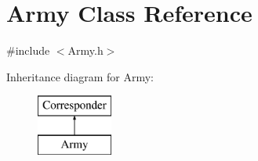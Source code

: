 \hypertarget{class_army}{}\section{Army Class Reference}
\label{class_army}


{\ttfamily \#include $<$Army.\+h$>$}

Inheritance diagram for Army\+:\begin{figure}[H]
\begin{center}
\leavevmode
\includegraphics[height=2.000000cm]{class_army}
\end{center}
\end{figure}
